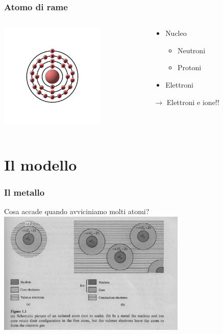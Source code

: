 	\begin{frame}[c]\frametitle{Atomo di rame}
	    \begin{columns}
			\begin{column}{0.4\textwidth}
				\centering \includegraphics[width=5cm]{./img/rame.png}
			\end{column}
			\begin{column}{0.4\textwidth}
				\begin{itemize}
					\item Nucleo
					\begin{itemize}
						\item Neutroni
						\item Protoni
					\end{itemize}
					\item Elettroni
				\end{itemize}

				\vspace{0.5cm}
				
				$\longrightarrow$ Elettroni e ione!!

			\end{column}
		\end{columns}
	
	\end{frame}


	\section{Il modello} %
	\label{sec:il_modello}
		\begin{frame}[c]\frametitle{Il metallo}
		    
		Cosa accade quando avviciniamo molti atomi?
		\centering \includegraphics[width=9cm]{./img/model.png}
		
		\end{frame}


